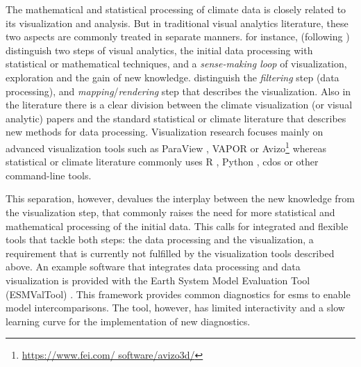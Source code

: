 \begin{refsection}
The mathematical and statistical processing of climate data is closely related to its visualization and analysis. But in traditional visual analytics literature, these two aspects are commonly treated in separate manners. \cite{KeimAndrienkoFeketeEtAl2008} for instance, (following \cite{Wijk2005}) distinguish two steps of visual analytics, the initial data processing with statistical or mathematical techniques, and a \textit{sense-making loop} of visualization, exploration and the gain of new knowledge. \cite{BoettingerRoeber2019} distinguish the \textit{filtering} step (data processing), and \textit{mapping}/\textit{rendering} step that describes the visualization. Also in the literature there is a clear division between the climate visualization (or visual analytic) papers and the standard statistical or climate literature that describes new methods for data processing. Visualization research focuses mainly on advanced visualization tools such as ParaView \citep{Ayachit2015}, VAPOR \citep{ClyneMininniNortonEtAl2007} or Avizo\footnote{\url{https://www.fei.com/
software/avizo3d/}} \citep[e.g.][]{RautenhausBoettingerSiemenEtAl2018, NockeBuschmannDongesEtAl2015, WongShenLeungEtAl2014, BoettingerRoeber2019} whereas statistical or climate literature commonly uses R \citep{RCT2019}, Python \citep{Oliphant2006, PerezGrangerHunter2011}, \glspl{cdo} \citep{Schulzweida2019} or other command-line tools.

This separation, however, devalues the interplay between the new knowledge from the visualization step, that commonly raises the need for more statistical and mathematical processing of the initial data. This calls for integrated and flexible tools that tackle both steps: the data processing and the visualization, a requirement that is currently not fulfilled by the visualization tools described above. An example software that integrates data processing and data visualization is provided with the Earth System Model Evaluation Tool (ESMValTool) \citep{EyringRighiLauerEtAl2016}. This framework provides common diagnostics for \glspl{esm} to enable model intercomparisons. The tool, however, has limited interactivity and a slow learning curve for the implementation of new diagnostics.


\end{refsection}
